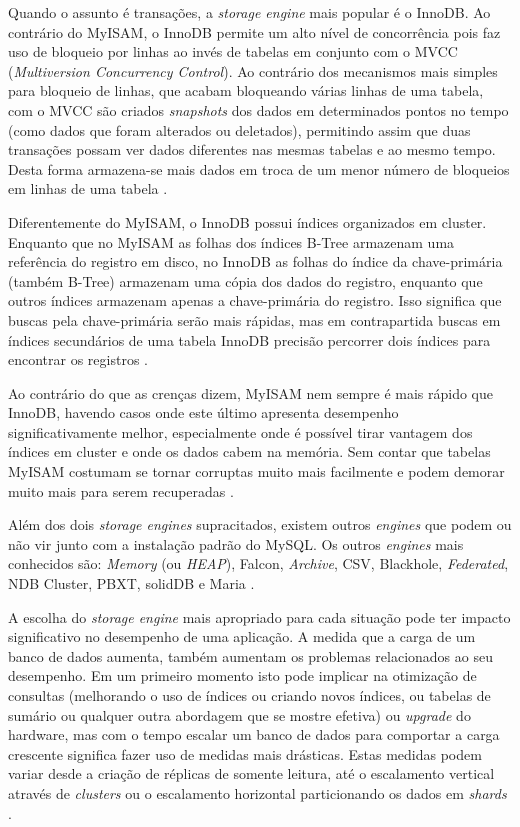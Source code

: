 \documentclass[diss]{template/setrem}
\begin{document}
Quando o assunto é transações, a \emph{storage engine} mais popular é o InnoDB. Ao contrário do MyISAM, o InnoDB permite um alto nível de concorrência pois faz uso de bloqueio por linhas ao invés de tabelas em conjunto com o MVCC (\emph{Multiversion Concurrency Control}). Ao contrário dos mecanismos mais simples para bloqueio de linhas, que acabam bloqueando várias linhas de uma tabela, com o MVCC são criados \emph{snapshots} dos dados em determinados pontos no tempo (como dados que foram alterados ou deletados), permitindo assim que duas transações possam ver dados diferentes nas mesmas tabelas e ao mesmo tempo. Desta forma armazena-se mais dados em troca de um menor número de bloqueios em linhas de uma tabela \citep{Schwartz2008}.

Diferentemente do MyISAM, o InnoDB possui índices organizados em cluster. Enquanto que no MyISAM as folhas dos índices B-Tree armazenam uma referência do registro em disco, no InnoDB as folhas do índice da chave-primária (também B-Tree) armazenam uma cópia dos dados do registro, enquanto que outros índices armazenam apenas a chave-primária do registro. Isso significa que buscas pela chave-primária serão mais rápidas, mas em contrapartida buscas em índices secundários de uma tabela InnoDB precisão percorrer dois índices para encontrar os registros \citep{Schwartz2008}.

Ao contrário do que as crenças dizem, MyISAM nem sempre é mais rápido que InnoDB, havendo casos onde este último apresenta desempenho significativamente melhor, especialmente onde é possível tirar vantagem dos índices em cluster e onde os dados cabem na memória. Sem contar que tabelas MyISAM costumam se tornar corruptas muito mais facilmente e podem demorar muito mais para serem recuperadas \citep{Schwartz2008}.

Além dos dois \emph{storage engines} supracitados, existem outros \emph{engines} que podem ou não vir junto com a instalação padrão do MySQL. Os outros \emph{engines} mais conhecidos são: \emph{Memory} (ou \emph{HEAP}), Falcon, \emph{Archive}, CSV, Blackhole, \emph{Federated}, NDB Cluster, PBXT, solidDB e Maria \citep{Schwartz2008}.

A escolha do \emph{storage engine} mais apropriado para cada situação pode ter impacto significativo no desempenho de uma aplicação. A medida que a carga de um banco de dados aumenta, também aumentam os problemas relacionados ao seu desempenho. Em um primeiro momento isto pode implicar na otimização de consultas (melhorando o uso de índices ou criando novos índices, ou tabelas de sumário ou qualquer outra abordagem que se mostre efetiva) ou \emph{upgrade} do hardware, mas com o tempo escalar um banco de dados para comportar a carga crescente significa fazer uso de medidas mais drásticas. Estas medidas podem variar desde a criação de réplicas de somente leitura, até o escalamento vertical através de \emph{clusters} ou o escalamento horizontal particionando os dados em \emph{shards} \citep{Henderson2006}.
\end{document}
